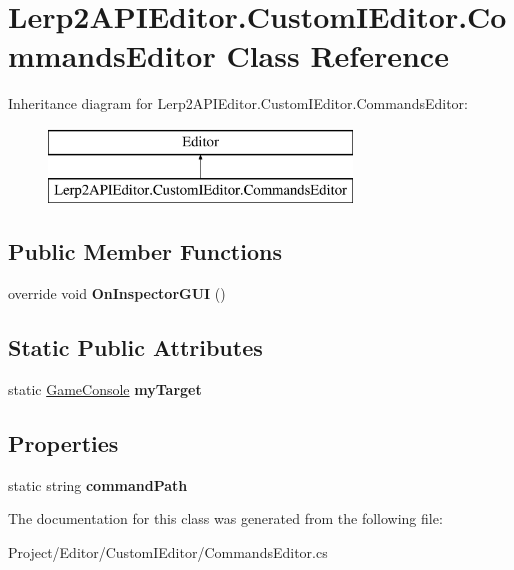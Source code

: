 \hypertarget{class_lerp2_a_p_i_editor_1_1_custom_i_editor_1_1_commands_editor}{}\section{Lerp2\+A\+P\+I\+Editor.\+Custom\+I\+Editor.\+Commands\+Editor Class Reference}
\label{class_lerp2_a_p_i_editor_1_1_custom_i_editor_1_1_commands_editor}
Inheritance diagram for Lerp2\+A\+P\+I\+Editor.\+Custom\+I\+Editor.\+Commands\+Editor\+:\begin{figure}[H]
\begin{center}
\leavevmode
\includegraphics[height=2.000000cm]{class_lerp2_a_p_i_editor_1_1_custom_i_editor_1_1_commands_editor}
\end{center}
\end{figure}
\subsection*{Public Member Functions}
\begin{DoxyCompactItemize}
\item 
\mbox{\label{class_lerp2_a_p_i_editor_1_1_custom_i_editor_1_1_commands_editor_a57aa4aadb86cb1eb731540617b2e8ca4}} 
override void {\bfseries On\+Inspector\+G\+UI} ()
\end{DoxyCompactItemize}
\subsection*{Static Public Attributes}
\begin{DoxyCompactItemize}
\item 
\mbox{\label{class_lerp2_a_p_i_editor_1_1_custom_i_editor_1_1_commands_editor_a3167bcd0435cbdbf044b2e1f61d55b94}} 
static \hyperlink{class_lerp2_a_p_i_1_1_game_1_1_game_console}{Game\+Console} {\bfseries my\+Target}
\end{DoxyCompactItemize}
\subsection*{Properties}
\begin{DoxyCompactItemize}
\item 
\mbox{\label{class_lerp2_a_p_i_editor_1_1_custom_i_editor_1_1_commands_editor_ac3323fe8f20022d9df929d3a299a7287}} 
static string {\bfseries command\+Path}
\end{DoxyCompactItemize}


The documentation for this class was generated from the following file\+:\begin{DoxyCompactItemize}
\item 
Project/\+Editor/\+Custom\+I\+Editor/Commands\+Editor.\+cs\end{DoxyCompactItemize}
